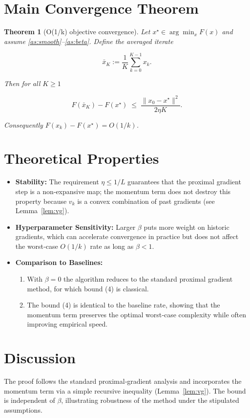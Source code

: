 \documentclass{article}
\newtheorem{theorem}{Theorem}
\begin{document}
\section*{Main Convergence Theorem}
\begin{theorem}[O(1/k) objective convergence]\label{thm:conv}
Let $x^{\star}\in\arg\min_{x}F(x)$ and assume \ref{as:smooth}–\ref{as:beta}.  
Define the averaged iterate  

\[
\bar{x}_{K}:=\frac{1}{K}\sum_{k=0}^{K-1}x_{k}.
\]

Then for all $K\ge1$  

\[
F(\bar{x}_{K})-F(x^{\star})\;\le\;\frac{\|x_{0}-x^{\star}\|^{2}}{2\eta K}. \tag{4}
\]

Consequently $F(x_{k})-F(x^{\star})=O(1/k)$.
\end{theorem}

\section*{Theoretical Properties}
\begin{itemize}[leftmargin=*]
\item \textbf{Stability:} The requirement $\eta\le1/L$ guarantees that the proximal gradient step is a non‑expansive map; the momentum term does not destroy this property because $v_{k}$ is a convex combination of past gradients (see Lemma~\ref{lem:vg}).
\item \textbf{Hyperparameter Sensitivity:} Larger $\beta$ puts more weight on historic gradients, which can accelerate convergence in practice but does not affect the worst‑case $O(1/k)$ rate as long as $\beta<1$.
\item \textbf{Comparison to Baselines:}
    \begin{enumerate}
    \item With $\beta=0$ the algorithm reduces to the standard proximal gradient method, for which bound (4) is classical.
    \item The bound (4) is identical to the baseline rate, showing that the momentum term preserves the optimal worst‑case complexity while often improving empirical speed.
    \end{enumerate}
\end{itemize}

\section*{Discussion}
The proof follows the standard proximal‑gradient analysis and incorporates the momentum term via a simple recursive inequality (Lemma~\ref{lem:vg}). The bound is independent of $\beta$, illustrating robustness of the method under the stipulated assumptions.
\end{document}
